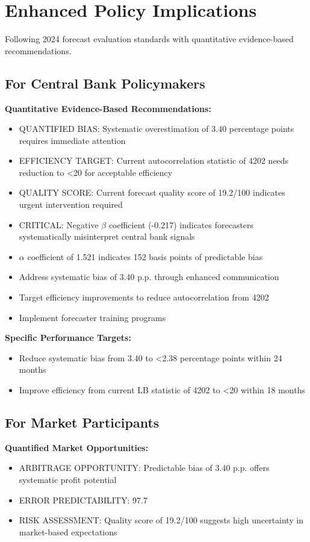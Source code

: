 \documentclass[11pt,a4paper]{article}
\begin{document}
\section{Enhanced Policy Implications}

Following 2024 forecast evaluation standards with quantitative evidence-based recommendations.

\subsection{For Central Bank Policymakers}
\textbf{Quantitative Evidence-Based Recommendations:}

\begin{itemize}
\item QUANTIFIED BIAS: Systematic overestimation of 3.40 percentage points requires immediate attention
\item EFFICIENCY TARGET: Current autocorrelation statistic of 4202 needs reduction to <20 for acceptable efficiency
\item QUALITY SCORE: Current forecast quality score of 19.2/100 indicates urgent intervention required
\item CRITICAL: Negative $\beta$ coefficient (-0.217) indicates forecasters systematically misinterpret central bank signals
\item $\alpha$ coefficient of 1.521 indicates 152 basis points of predictable bias
\item Address systematic bias of 3.40 p.p. through enhanced communication
\item Target efficiency improvements to reduce autocorrelation from 4202
\item Implement forecaster training programs
\end{itemize}

\textbf{Specific Performance Targets:}
\begin{itemize}
\item Reduce systematic bias from 3.40 to <2.38 percentage points within 24 months
\item Improve efficiency from current LB statistic of 4202 to <20 within 18 months
\end{itemize}

\subsection{For Market Participants}
\textbf{Quantified Market Opportunities:}

\begin{itemize}
\item ARBITRAGE OPPORTUNITY: Predictable bias of 3.40 p.p. offers systematic profit potential
\item ERROR PREDICTABILITY: 97.7%
\item RISK ASSESSMENT: Quality score of 19.2/100 suggests high uncertainty in market-based expectations
\end{itemize}
\end{document}
